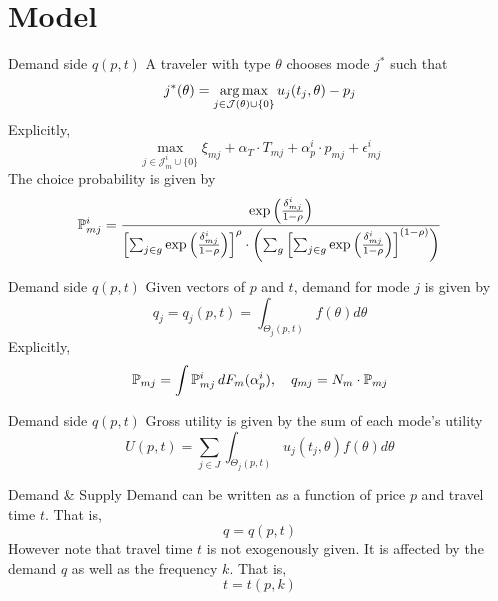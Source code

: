 \documentclass[10pt, aspectratio=169]{beamer}
\begin{document}
\section{Model}
\begin{frame}{Demand side $q(p,t)$}
  A traveler with type $\theta$ chooses mode $j^*$ such that
  \begin{equation*}
    j^*(\theta) = \operatorname*{arg\,max}_{j \in \mathcal{J}(\theta) \cup \{0\}} u_j(t_j, \theta) - p_j
  \end{equation*}
  Explicitly,
  \begin{equation*}
    \max_{j \in \mathcal{J}_m^i \cup \{0\}} \xi_{mj} + \alpha_T \cdot T_{mj} + \alpha_p^i \cdot p_{mj} + \epsilon_{mj}^i
  \end{equation*}
  The choice probability is given by
  \begin{equation*}
    \mathbb{P}_{mj}^i = \frac{\exp\left( \frac{\delta_{mj}^i}{1-\rho} \right)}{
      \left[ \sum_{j \in g} \exp\left( \frac{\delta_{mj}^i}{1-\rho} \right) \right]^\rho \cdot \left( \sum_g \left[ \sum_{j \in g} \exp\left( \frac{\delta_{mj}^i}{1-\rho} \right) \right]^{(1-\rho)} \right)}
  \end{equation*}
\end{frame}

\begin{frame}{Demand side $q(p,t)$}
  Given vectors of $p$ and $t$, demand for mode $j$ is given by
  \begin{equation*}
    q_j = q_j({p}, {t}) = \int_{\Theta_j({p}, {t})} f(\theta) d\theta
  \end{equation*}
  Explicitly,
  \begin{equation*}
    \mathbb{P}_{mj} = \int \mathbb{P}_{mj}^i \, dF_m(\alpha_p^i),
    \quad q_{mj} = N_m \cdot \mathbb{P}_{mj}
  \end{equation*}
\end{frame}

\begin{frame}{Demand side $q(p,t)$}
  Gross utility is given by the sum of each mode's utility
  \begin{equation*}
    U(p,t) = \sum_{j\in J} \int_{\Theta_j(p,t)} u_j(t_j,\theta) f(\theta) d\theta
  \end{equation*}
  \begin{block}{Demand \& Supply}
    Demand can be written as a function of price $p$ and travel time $t$. That is,
    \begin{equation*}
      q = q(p,t)
    \end{equation*}
    However note that travel time $t$ is not exogenously given. It is affected by
    the demand $q$ as well as the frequency $k$. That is,
    \begin{equation*}
      t = t(p,k)
    \end{equation*}
  \end{block}

\end{frame}
\end{document}
